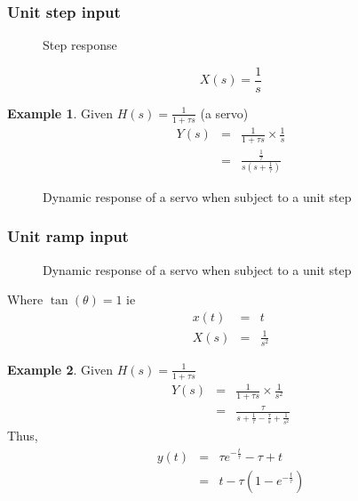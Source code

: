 \documentclass[11pt]{article} %
\theoremstyle{definition}
\newtheorem{example}{Example}[subsection]
\begin{document}
\subsubsection{Unit step input}
	\begin{figure}[h]
		\centering
		\caption{Step response}
	\end{figure}
	\begin{equation}
		X(s)=\frac{1}{s}
	\end{equation}
	\begin{example}
		Given $H(s)=\frac{1}{1+\tau s}$ (a servo)
		\begin{eqnarray}
			Y(s) &=& \frac{1}{1+\tau s} \times \frac{1}{s} \nonumber \\
			&=& \frac{\frac{1}{\tau}}{s\left( s+ \frac{1}{\tau}\right)}
		\end{eqnarray}
		\begin{figure}[h]
			\centering
			\caption{Dynamic response of a servo when subject to a unit step}
		\end{figure}
	\end{example}


\subsubsection{Unit ramp input}
	\begin{figure}[h]
		\centering
		\caption{Dynamic response of a servo when subject to a unit step}
	\end{figure}
	Where $\tan {(\theta)} = 1$ ie
	\begin{eqnarray}
		x(t) &=& t \nonumber \\
		X(s) &=& \frac{1}{s^2}
	\end{eqnarray}

	\begin{example}
	Given $H(s) = \frac{1}{1+\tau s}$
	\begin{eqnarray}
		Y(s) &=& \frac{1}{1+\tau s} \times \frac{1}{s^2}  \nonumber  \\
		&=& \frac{\tau}{s+\frac{1}{\tau} - \frac{\tau}{s} + \frac{1}{s^2}}
	\end{eqnarray}
	Thus,
	\begin{eqnarray}
		y(t) &=& \tau e^{-\frac{t}{\tau}} - \tau + t \nonumber \\
		&=& t-\tau\left(1-e^{-\frac{t}{\tau}}\right)
	\end{eqnarray}
	\end{example}
\end{document}
